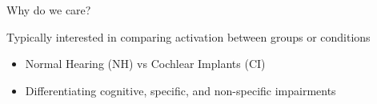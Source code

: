 \documentclass{beamer}
\providecommand{\cn}[1]{\textcolor{blue}{#1}}
\begin{document}
\begin{frame}{Why do we care?}

Typically interested in comparing activation between groups or conditions \vspace{2mm}

\begin{itemize}
\item Normal Hearing (NH) vs Cochlear Implants (CI) \vspace{2mm}
\item Differentiating cognitive, specific, and non-specific impairments \vspace{2mm}
\end{itemize}


\end{frame}

%
%
%
%
%
%
\end{document}
